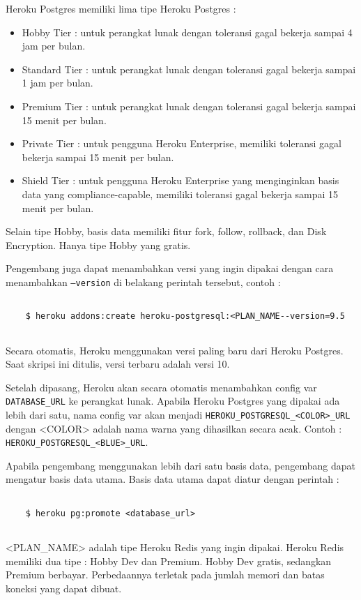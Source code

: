 Heroku Postgres memiliki lima tipe Heroku Postgres :
\begin{itemize}
\item Hobby Tier : untuk perangkat lunak dengan toleransi gagal bekerja sampai 4 jam per bulan.
\item Standard Tier : untuk perangkat lunak dengan toleransi gagal bekerja sampai 1 jam per bulan.
\item Premium Tier : untuk perangkat lunak dengan toleransi gagal bekerja sampai 15 menit per bulan.
\item Private Tier : untuk pengguna Heroku Enterprise, memiliki toleransi gagal bekerja sampai 15 menit per bulan.
\item Shield Tier : untuk pengguna Heroku Enterprise yang menginginkan basis data yang compliance-capable, memiliki toleransi gagal bekerja sampai 15 menit per bulan.
\end{itemize}
Selain tipe Hobby, basis data memiliki fitur fork, follow, rollback, dan Disk Encryption. Hanya tipe Hobby yang gratis.

Pengembang juga dapat menambahkan versi yang ingin dipakai dengan cara menambahkan \texttt{--version} di belakang perintah tersebut, contoh :
\begin{lstlisting}
	
	$ heroku addons:create heroku-postgresql:<PLAN_NAME--version=9.5
	
\end{lstlisting}
Secara otomatis, Heroku menggunakan versi paling baru dari Heroku Postgres. Saat skripsi ini ditulis, versi terbaru adalah versi 10.

Setelah dipasang, Heroku akan secara otomatis menambahkan config var \texttt{DATABASE\_URL} ke perangkat lunak. Apabila Heroku Postgres yang dipakai ada lebih dari satu, nama config var akan menjadi \texttt{HEROKU\_POSTGRESQL\_<COLOR>\_URL} dengan <COLOR> adalah nama warna yang dihasilkan secara acak. Contoh : \texttt{HEROKU\_POSTGRESQL\_<BLUE>\_URL}.

Apabila pengembang menggunakan lebih dari satu basis data, pengembang dapat mengatur basis data utama. Basis data utama dapat diatur dengan perintah :
\begin{lstlisting}
	
	$ heroku pg:promote <database_url>
	
\end{lstlisting}
<PLAN\_NAME> adalah tipe Heroku Redis yang ingin dipakai. Heroku Redis memiliki dua tipe : Hobby Dev dan Premium. Hobby Dev gratis, sedangkan Premium berbayar. Perbedaannya terletak pada jumlah memori dan batas koneksi yang dapat dibuat.


